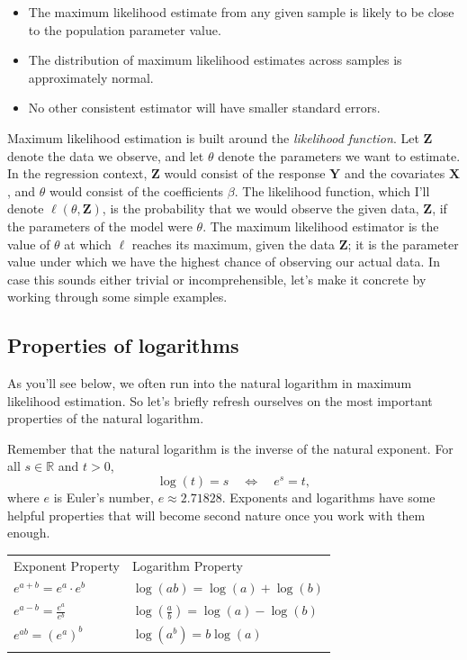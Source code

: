 \documentclass[
  12pt,
  oneside,openany]{book}
\begin{document}
\begin{itemize}
  \begin{itemize}
  \item
    The maximum likelihood estimate from any given sample is likely to be close to the population parameter value.
  \item
    The distribution of maximum likelihood estimates across samples is approximately normal.
  \item
    No other consistent estimator will have smaller standard errors.
  \end{itemize}
\end{itemize}

Maximum likelihood estimation is built around the \emph{likelihood function}.
Let \(\mathbf{Z}\) denote the data we observe, and let \(\theta\) denote the parameters we want to estimate.
In the regression context, \(\mathbf{Z}\) would consist of the response \(\mathbf{Y}\) and the covariates \(\mathbf{X}\), and \(\theta\) would consist of the coefficients \(\beta\).
The likelihood function, which I'll denote \(\ell(\theta, \mathbf{Z})\), is the probability that we would observe the given data, \(\mathbf{Z}\), if the parameters of the model were \(\theta\).
The maximum likelihood estimator is the value of \(\theta\) at which \(\ell\) reaches its maximum, given the data \(\mathbf{Z}\); it is the parameter value under which we have the highest chance of observing our actual data.
In case this sounds either trivial or incomprehensible, let's make it concrete by working through some simple examples.

\hypertarget{properties-of-logarithms}{%
\subsection{Properties of logarithms}\label{properties-of-logarithms}}

As you'll see below, we often run into the natural logarithm in maximum likelihood estimation.
So let's briefly refresh ourselves on the most important properties of the natural logarithm.

Remember that the natural logarithm is the inverse of the natural exponent.
For all \(s \in \mathbb{R}\) and \(t > 0\),
\[
\log (t) = s \quad \Leftrightarrow \quad e^s = t,
\]
where \(e\) is Euler's number, \(e \approx 2.71828\).
Exponents and logarithms have some helpful properties that will become second nature once you work with them enough.

\begin{longtable}[]{@{}ll@{}}
\toprule
Exponent Property & Logarithm Property \\ \addlinespace
\midrule
\endhead
\(e^{a + b} = e^a \cdot e^b\) & \(\log (ab) = \log(a) + \log(b)\) \\ \addlinespace
\(e^{a - b} = \frac{e^a}{e^b}\) & \(\log (\frac{a}{b}) = \log(a) - \log(b)\) \\ \addlinespace
\(e^{ab} = (e^a)^b\) & \(\log (a^b) = b \log (a)\) \\ \addlinespace
\bottomrule
\end{longtable}
\end{document}
